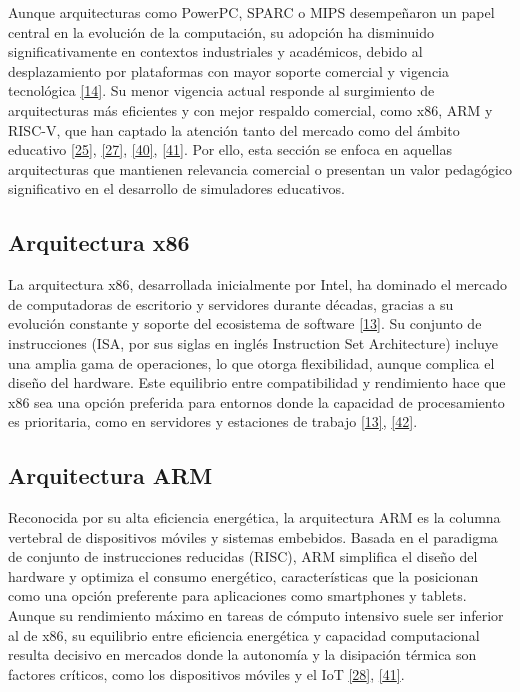 \documentclass[12pt,oneside]{templates/unerthesis}
\begin{document}
Aunque arquitecturas como PowerPC, SPARC o MIPS desempeñaron un papel central en la evolución de la computación, su adopción ha disminuido significativamente en contextos industriales y académicos, debido al desplazamiento por plataformas con mayor soporte comercial y vigencia tecnológica \protect\hyperlink{ref-stallings_computer_2021}{{[}14{]}}. Su menor vigencia actual responde al surgimiento de arquitecturas más eficientes y con mejor respaldo comercial, como x86, ARM y RISC-V, que han captado la atención tanto del mercado como del ámbito educativo \protect\hyperlink{ref-waterman_risc-v_2014}{{[}25{]}}, \protect\hyperlink{ref-null_essentials_2023}{{[}27{]}}, \protect\hyperlink{ref-hennessy2017computer_riscv}{{[}40{]}}, \protect\hyperlink{ref-arm_evolution_2025}{{[}41{]}}. Por ello, esta sección se enfoca en aquellas arquitecturas que mantienen relevancia comercial o presentan un valor pedagógico significativo en el desarrollo de simuladores educativos.

\hypertarget{arquitectura-x86}{%
\subsection{Arquitectura x86}\label{arquitectura-x86}}

La arquitectura x86, desarrollada inicialmente por Intel, ha dominado el mercado de computadoras de escritorio y servidores durante décadas, gracias a su evolución constante y soporte del ecosistema de software \protect\hyperlink{ref-hennessy2017computer}{{[}13{]}}. Su conjunto de instrucciones (ISA, por sus siglas en inglés Instruction Set Architecture) incluye una amplia gama de operaciones, lo que otorga flexibilidad, aunque complica el diseño del hardware. Este equilibrio entre compatibilidad y rendimiento hace que x86 sea una opción preferida para entornos donde la capacidad de procesamiento es prioritaria, como en servidores y estaciones de trabajo \protect\hyperlink{ref-hennessy2017computer}{{[}13{]}}, \protect\hyperlink{ref-intel_whitepaper_2023}{{[}42{]}}.

\hypertarget{arquitectura-arm}{%
\subsection{Arquitectura ARM}\label{arquitectura-arm}}

Reconocida por su alta eficiencia energética, la arquitectura ARM es la columna vertebral de dispositivos móviles y sistemas embebidos. Basada en el paradigma de conjunto de instrucciones reducidas (RISC), ARM simplifica el diseño del hardware y optimiza el consumo energético, características que la posicionan como una opción preferente para aplicaciones como smartphones y tablets. Aunque su rendimiento máximo en tareas de cómputo intensivo suele ser inferior al de x86, su equilibrio entre eficiencia energética y capacidad computacional resulta decisivo en mercados donde la autonomía y la disipación térmica son factores críticos, como los dispositivos móviles y el IoT \protect\hyperlink{ref-patterson_computer_2014}{{[}28{]}}, \protect\hyperlink{ref-arm_evolution_2025}{{[}41{]}}.
\end{document}
